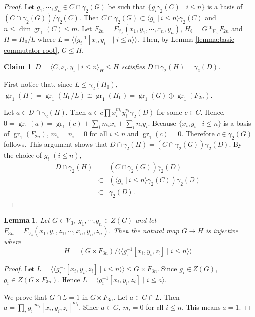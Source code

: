 \documentclass[11pt,reqno]{article}
\newtheorem{lemma}[theorem]{Lemma}
\newtheorem{claim}{Claim}[theorem]
\theoremstyle{definition}
\theoremstyle{remark}
\DeclareMathOperator{\gr}{gr}
\newcommand{\llangle}{\langle\!\langle}
\newcommand{\rrangle}{\rangle\!\rangle}
\begin{document}
\begin{proof}
    Let $g_1,\cdots, g_n\in C\cap \gamma_2(G)$ be such that $\{g_i\gamma_2(C)\mid i\leq n\}$ is a basis of $(C\cap \gamma_2(G))/\gamma_2(C)$.
    Then $C\cap \gamma_2(G)\subset \langle g_i\mid i\leq n\rangle \gamma_2(C)$ and $n\leq \dim\gr_1(C) \leq m$.
    Let $F_{2n}=F_{\mathcal V_3}(x_1,y_1,\cdots, x_n,y_n)$, $H_0=G*_{\mathcal V_3} F_{2n}$ and $H=H_0/L$ where $L=\llangle g_i^{-1}[x_i,y_i]\mid i\leq n\rrangle$.
    Then, by Lemma \ref{lemma:basic commutator root}, $G\leq H$.
    

    \begin{claim}
        $D=\langle C, x_i,y_i\mid i\leq n\rangle_H \leq H$ satisfies $D\cap \gamma_2(H)=\gamma_2(D)$.
    \end{claim}
    First notice that, since $L\leq \gamma_2(H_0)$, $\gr_1(H)=\gr_1(H_0/L)\cong \gr_1(H_0)=\gr_1(G)\oplus \gr_1(F_{2n})$.

    Let $a\in D\cap \gamma_2(H)$.
    Then $a\in c\prod x_i^{m_i}y_i^{n_i}\gamma_2(D)$ for some $c\in C$.
    Hence, $0=\gr_1(a)=\gr_1(c)+\sum_i m_ix_i+\sum_i n_iy_i$.
    Because $\{x_i,y_i\mid i\leq n\}$ is a basis of $\gr_1(F_{2n})$, $m_i=n_i=0$ for all $i\leq n$ and $\gr_1(c)=0$. 
    Therefore $c\in \gamma_2(G)$ follows.
    This argument shows that $D\cap \gamma_2(H)=(C\cap \gamma_2(G))\gamma_2(D)$.
    By the choice of $g_i$ $(i\leq n)$, 
    \begin{eqnarray*}
        D\cap \gamma_2(H)&=& (C\cap \gamma_2(G))\gamma_2(D)\\ 
        &\subset& \left(\langle g_i\mid i\leq n\rangle\gamma_2(C)\right)\gamma_2(D)\\ 
        &\subset& \gamma_2(D). 
    \end{eqnarray*}
\end{proof}

\begin{lemma}\label{lemma:triple commutator root}
    Let $G\in\mathcal V_3$, $g_1,\cdots, g_n \in Z(G)$ and let $F_{3n}=F_{\mathcal V_3}(x_1,y_1,z_1,\cdots, x_n,y_n,z_n)$.
    Then
    the natural map $G\to H$ is injective where
    \[
        H=(G\times F_{3n})/\llangle g_i^{-1}[x_i,y_i,z_i]\mid i\leq n\rrangle
    \]
\end{lemma}

\begin{proof}
    Let $L=\llangle g_i^{-1}[x_i,y_i,z_i]\mid i\leq n\rrangle\leq G\times F_{3n}$.
    Since $g_i\in Z(G)$, $g_i\in Z(G\times F_{3n})$.
    Hence $L=\langle g_i^{-1}[x_i,y_i,z_i]\mid i\leq n\rangle$.

    We prove that $G\cap L=1$ in $G\times F_{3n}$.
    Let $a\in G\cap L$.
    Then $a=\prod_i g_i^{-m_i}[x_i,y_i,z_i]^{m_i}$.
    Since $a\in G$, $m_i=0$ for all $i\leq n$. 
    This means $a=1$.
\end{proof}
\end{document}
